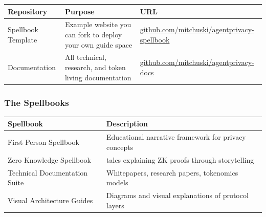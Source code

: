 \documentclass[
]{article}
\newcounter{none} %
\begin{document}
{\def\LTcaptype{none} %
\begin{longtable}[]{@{}
  >{\raggedright\arraybackslash}p{}
  >{\raggedright\arraybackslash}p{}
  >{\raggedright\arraybackslash}p{}@{}}
\toprule\noalign{}
\begin{minipage}[b]{\linewidth}\raggedright
Repository
\end{minipage} & \begin{minipage}[b]{\linewidth}\raggedright
Purpose
\end{minipage} & \begin{minipage}[b]{\linewidth}\raggedright
URL
\end{minipage} \\
\midrule\noalign{}
\endhead
\bottomrule\noalign{}
\endlastfoot
Spellbook Template & Example website you can fork to deploy your own
guide space &
\href{https://github.com/mitchuski/agentprivacy-spellbook}{github.com/mitchuski/agentprivacy-spellbook} \\
Documentation & All technical, research, and token living documentation
&
\href{https://github.com/mitchuski/agentprivacy-docs}{github.com/mitchuski/agentprivacy-docs} \\
\end{longtable}
}

\subsubsection{The Spellbooks}\label{the-spellbooks}

{\def\LTcaptype{none} %
\begin{longtable}[]{@{}
  >{\raggedright\arraybackslash}p{}
  >{\raggedright\arraybackslash}p{}@{}}
\toprule\noalign{}
\begin{minipage}[b]{\linewidth}\raggedright
Spellbook
\end{minipage} & \begin{minipage}[b]{\linewidth}\raggedright
Description
\end{minipage} \\
\midrule\noalign{}
\endhead
\bottomrule\noalign{}
\endlastfoot
First Person Spellbook & Educational narrative framework for privacy
concepts \\
Zero Knowledge Spellbook & 30 tales explaining ZK proofs through
storytelling \\
Technical Documentation Suite & Whitepapers, research papers, tokenomics
models \\
Visual Architecture Guides & Diagrams and visual explanations of
protocol layers \\
\end{longtable}
}
\end{document}
